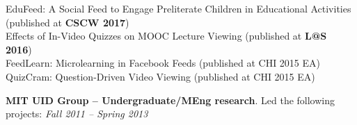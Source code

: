 \documentclass[margin,line]{resume}
\begin{document}
\begin{resume}
\vspace{-2mm}

EduFeed: A Social Feed to Engage Preliterate Children in Educational Activities (published at \textbf{CSCW 2017})\\
Effects of In-Video Quizzes on MOOC Lecture Viewing (published at \textbf{L@S 2016})\\
FeedLearn: Microlearning in Facebook Feeds (published at CHI 2015 EA)\\
QuizCram: Question-Driven Video Viewing (published at CHI 2015 EA) %

%

\textbf{MIT UID Group -- Undergraduate/MEng research}. Led the following projects: \hfill \textsl{Fall 2011 -- Spring 2013}

\vspace{-2mm}


\end{resume}
\end{document}
